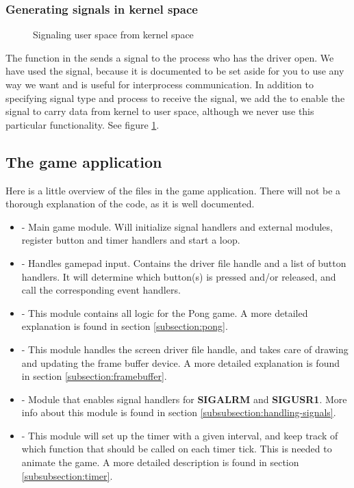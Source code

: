 \subsubsection{Generating signals in kernel space}
\begin{figure}[h]
	\centering
	
	\caption{Signaling user space from kernel space}
	\label{fig:signal-user-application}
\end{figure}
The  function in the  sends a signal to the process who has the driver open. We have used the  signal, because it is documented to be set aside for you to use any way we want and is useful for interprocess communication. In addition to specifying signal type and process to receive the signal, we add the  to enable the signal to carry data from kernel to user space, although we never use this particular functionality. See figure \ref{fig:signal-user-application}.

\subsection{The game application}
\label{subsection:the_game_application}
Here is a little overview of the files in the game application. There will not be a thorough explanation of the code, as it is well documented.

\begin{itemize}
	\item {} - Main game module. Will initialize signal handlers and external modules, register button and timer handlers and start a  loop. 
	\item {} - Handles gamepad input. Contains the driver file handle and a list of button handlers. It will determine which button(s) is pressed and/or released, and call the corresponding event handlers.
	\item {} - This module contains all logic for the Pong game. A more detailed explanation is found in section \ref{subsection:pong}.
	\item {} - This module handles the screen driver file handle, and takes care of drawing and updating the frame buffer device. A more detailed explanation is found in section \ref{subsection:framebuffer}.
	\item {} - Module that enables signal handlers for \textbf{SIGALRM} and \textbf{SIGUSR1}. More info about this module is found in section \ref{subsubsection:handling-signals}.
	\item {} - This module will set up the timer with a given interval, and keep track of which function that should be called on each timer tick. This is needed to animate the game. A more detailed description is found in section \ref{subsubsection:timer}.
\end{itemize}

